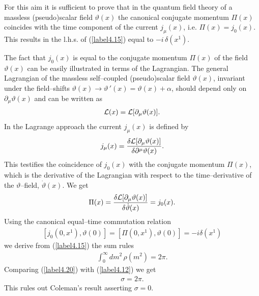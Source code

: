 \documentclass[a4paper,12pt] {article}
\begin{document}
For this aim it is sufficient to prove that in the quantum field
theory of a massless (pseudo)scalar field $\vartheta(x)$ the canonical
conjugate momentum $\Pi(x)$ coincides with the time component of the
current $j_{\mu}(x)$, i.e. $\Pi(x) = j_0(x)$. This results in the
l.h.s. of (\ref{label4.15}) equal to $-i\,\delta(x^1)$.

The fact that $j_0(x)$ is equal to the conjugate momentum $\Pi(x)$ of
the field $\vartheta(x)$ can be easily illustrated in terms of the
Lagrangian. The general Lagrangian of the massless self--coupled
(pseudo)scalar field $\vartheta(x)$, invariant under the field--shifts
$\vartheta(x) \to \vartheta\,'(x) = \vartheta(x) + \alpha$, should
depend only on $\partial_{\mu}\vartheta(x)$ and can be written as
%
\begin{eqnarray}\label{label4.16}
{\cal L}(x) = {\cal L}[\partial_{\mu}\vartheta(x)].
\end{eqnarray}
%
In the Lagrange approach the current $j_{\mu}(x)$ is defined by 
%
\begin{eqnarray}\label{label4.17}
j_{\mu}(x) = \frac{\delta {\cal L}[\partial_{\mu}\vartheta(x)]}{\delta
\partial^{\mu}\vartheta(x)}.
\end{eqnarray}
%
This testifies the coincidence of $j_0(x)$ with the conjugate momentum
$\Pi(x)$, which is the derivative of the Lagrangian with respect to
the time--derivative of the $\vartheta$--field,
$\dot{\vartheta}(x)$. We get
%
\begin{eqnarray}\label{label4.18}
\Pi(x)= \frac{\delta {\cal L}[\partial_{\mu}\vartheta(x)]}{\delta
\dot{\vartheta}(x)} = j_0(x).
\end{eqnarray}
%
Using the canonical equal--time commutation relation 
%
\begin{eqnarray}\label{label4.19}
[j_0(0,x^1),\vartheta(0)] = [\Pi(0,x^1),\vartheta(0)] = -i\delta(x^1)
\end{eqnarray}
%
we derive from (\ref{label4.15}) the sum rules
%
\begin{eqnarray}\label{label4.20}
\int^{\infty}_0dm^2\,\rho(m^2) = 2\pi.
\end{eqnarray}
%
Comparing (\ref{label4.20}) with (\ref{label4.12}) we get
%
\begin{eqnarray}\label{label4.21}
\sigma = 2\pi.
\end{eqnarray}
%
This rules out Coleman's result asserting $\sigma = 0$.
\end{document}
